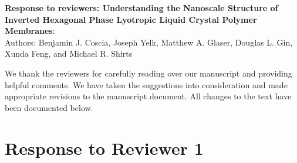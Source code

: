 \documentclass{article}
\begin{document}
\begin{center}
\textbf{Response to reviewers: Understanding the Nanoscale Structure of Inverted Hexagonal Phase Lyotropic Liquid Crystal Polymer Membranes}: \\
Authors: Benjamin J. Coscia, Joseph Yelk, Matthew A. Glaser, Douglas L. Gin, Xunda Feng, and Michael R. Shirts
\end{center}

We thank the reviewers for carefully reading over our manuscript and providing
helpful comments. We have taken the suggestions into consideration and made
appropriate revisions to the manuscript document. All changes to the text have
been documented below. 

\section{Response to Reviewer 1}
\end{document}
